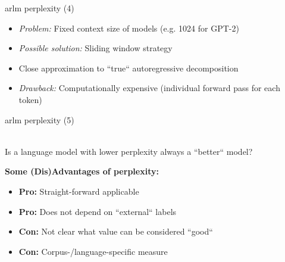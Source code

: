\begin{frame}{arlm perplexity (4)}

\vfill

\begin{itemize}
	\item \textit{Problem:} Fixed context size of models (e.g. 1024 for GPT-2) 
\end{itemize}

\begin{figure}
    \centering
\end{figure}

\begin{itemize}
	\item \textit{Possible solution:} Sliding window strategy
	\item Close approximation to ``true`` autoregressive decomposition
	\item \textit{Drawback:} Computationally expensive (individual forward pass for each token)
\end{itemize}

\vfill

\end{frame}


\begin{frame}{arlm perplexity (5)}

\vfill

\ques\\ Is a language model with lower perplexity always a ``better`` model?

\vspace{.5cm}

\textbf{Some (Dis)Advantages of perplexity:}

\begin{itemize}
	\item \textbf{Pro:} Straight-forward applicable
	\item \textbf{Pro:} Does not depend on ``external`` labels
	\item \textbf{Con:} Not clear what value can be considered ``good``
	\item \textbf{Con:} Corpus-/language-specific measure
\end{itemize}

\vfill

\end{frame}

